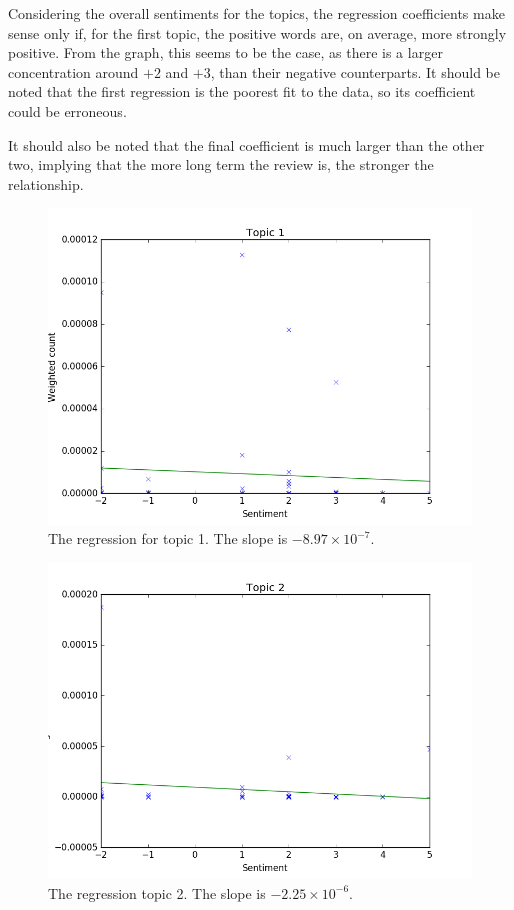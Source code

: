 \documentclass[onecolumn,prl,aps,10pt]{revtex4}
\begin{document}
Considering the overall sentiments for the topics, the regression coefficients make sense only if, for the first topic, the positive words are, on average, more strongly positive. From the graph, this seems to be the case, as there is a larger concentration around $+2$ and $+3$, than their negative counterparts. It should be noted that the first regression is the poorest fit to the data, so its coefficient could be erroneous.

It should also be noted that the final coefficient is much larger than the other two, implying that the more long term the review is, the stronger the relationship.

\begin{figure}
\includegraphics*[clip]{topic1reg.png}
\caption{The regression for topic 1. The slope is $-8.97 \times 10^{-7}$.} \label{top1}
\end{figure}
\begin{figure}
\includegraphics*[clip]{topic2reg.png}
\caption{The regression topic 2. The slope is $-2.25 \times 10^{-6}$.} \label{top2}
\end{figure}
\end{document}
